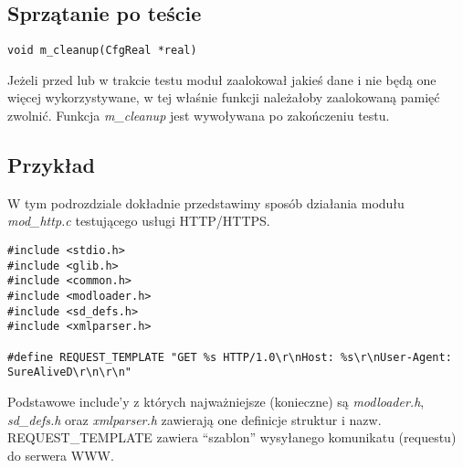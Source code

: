\documentclass[polish,12pt]{article}
\begin{document}
\subsection{Sprzątanie po teście}
\begin{verbatim}
void m_cleanup(CfgReal *real)
\end{verbatim}
Jeżeli przed lub w trakcie testu moduł zaalokował jakieś dane i nie będą one więcej wykorzystywane,
w tej właśnie funkcji należałoby zaalokowaną pamięć zwolnić. Funkcja \textit{m\_cleanup} jest 
wywoływana po zakończeniu testu.

\newpage
\subsection{Przykład}
W tym podrozdziale dokładnie przedstawimy sposób działania modułu \textit{mod\_http.c} testującego usługi
HTTP/HTTPS.
{\small
\begin{verbatim}
#include <stdio.h>
#include <glib.h>
#include <common.h>
#include <modloader.h>
#include <sd_defs.h>
#include <xmlparser.h>

#define REQUEST_TEMPLATE "GET %s HTTP/1.0\r\nHost: %s\r\nUser-Agent: SureAliveD\r\n\r\n"
\end{verbatim}
}
Podstawowe include'y z których najważniejsze (konieczne) są \textit{modloader.h}, \textit{sd\_defs.h} oraz
\textit{xmlparser.h} zawierają one definicje struktur i nazw.
REQUEST\_TEMPLATE zawiera ``szablon'' wysyłanego komunikatu (requestu) do serwera WWW.
\end{document}
